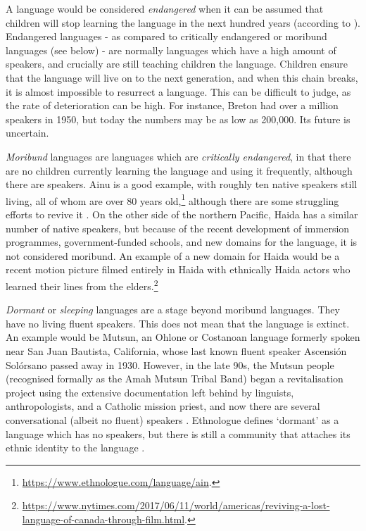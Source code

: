 A language would be considered {\it endangered} when it can be assumed that children will stop learning the language in the next hundred years (according to \citet{krauss92}). Endangered languages - as compared to critically endangered or moribund languages (see below) - are normally languages which have a high amount of speakers, and crucially are still teaching children the language. Children ensure that the language will live on to the next generation, and when this chain breaks, it is almost impossible to resurrect a language. This can be difficult to judge, as the rate of deterioration can be high. For instance, Breton had over a million speakers in 1950, but today the numbers may be as low as 200,000. Its future is uncertain.

\emph{Moribund} languages are languages which are {\it critically endangered}, in that there are no children currently learning the language and using it frequently, although there are speakers. Ainu is a good example, with roughly ten native speakers still living, all of whom are over 80 years old,\footnote{\href{https://www.ethnologue.com/language/ain}{https://www.ethnologue.com/language/ain}. } although there are some struggling efforts to revive it \citep{hanks2017policy}. On the other side of the northern Pacific, Haida has a similar number of native speakers, but because of the recent development of immersion programmes, government-funded schools, and new domains for the language, it is not considered moribund. An example of a new domain for Haida would be a recent motion picture filmed entirely in Haida with ethnically Haida actors who learned their lines from the elders.\footnote{\href{https://www.nytimes.com/2017/06/11/world/americas/reviving-a-lost-language-of-canada-through-film.html}{https://www.nytimes.com/2017/06/11/world/americas/reviving-a-lost-language-of-canada-through-film.html}. }

\emph{Dormant} or \textit{sleeping} languages are a stage beyond moribund languages. They have no living fluent speakers. This does not mean that the language is extinct. An example would be Mutsun, an Ohlone or Costanoan language formerly spoken near San Juan Bautista, California, whose last known fluent speaker Ascensi\'on Sol\'orsano passed away in 1930. However, in the late 90s, the Mutsun people (recognised formally as the Amah Mutsun Tribal Band) began a revitalisation project using the extensive documentation left behind by linguists, anthropologists, and a Catholic mission priest, and now there are several conversational (albeit no fluent) speakers \citep{warner2007ethics}. Ethnologue defines `dormant' as a language which has no speakers, but there is still a community that attaches its ethnic identity to the language \citep{lewis2010assessing}.


